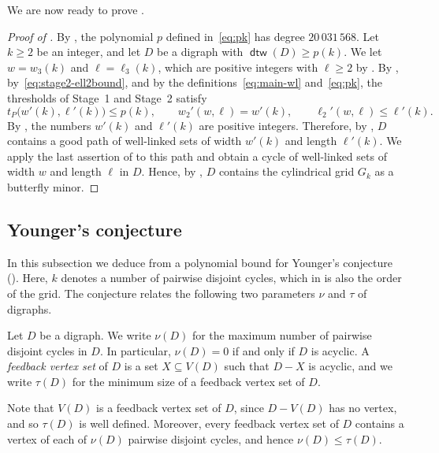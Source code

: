 \documentclass[fontsize=12pt,leading=14pt]{fullpaper}
\DeclareMathOperator{\dtw}{\mathsf{dtw}}
\begin{document}
We are now ready to prove .

\begin{proof}[Proof of ]
  By , the polynomial $p$ defined in~\eqref{eq:pk} has degree $20\,031\,568$.
  Let $k\ge2$ be an integer, and let $D$ be a digraph with $\dtw(D)\ge p(k)$.
  We let $w=w_3(k)$ and $\ell=\ell_3(k)$, which are positive integers with $\ell\ge2$ by .
  By , by~\eqref{eq:stage2-ell2bound}, and by the definitions~\eqref{eq:main-wl} and~\eqref{eq:pk}, the thresholds of Stage~1 and Stage~2 satisfy
  \[
    t_P\bigl(w'(k),\ell'(k)\bigr)\le p(k),\qquad
    w_2'(w,\ell)=w'(k),\qquad\ell_2'(w,\ell)\le\ell'(k).
  \]
  By , the numbers $w'(k)$ and $\ell'(k)$ are positive integers.
  Therefore, by , $D$ contains a good path of well-linked sets of width $w'(k)$ and length $\ell'(k)$.
  We apply the last assertion of  to this path and obtain a cycle of well-linked sets of width $w$ and length $\ell$ in $D$.
  Hence, by , $D$ contains the cylindrical grid $G_k$ as a butterfly minor.
\end{proof}

\subsection{Younger's conjecture}\label{sec:main-younger}

In this subsection we deduce from  a polynomial bound for Younger's conjecture ().
Here, $k$ denotes a number of pairwise disjoint cycles, which in  is also the order of the grid.
The conjecture relates the following two parameters $\nu$ and $\tau$ of digraphs.

\begin{definition}\label{def:nu-tau}
  Let $D$ be a digraph.
  We write $\nu(D)$ for the maximum number of pairwise disjoint cycles in $D$.
  In particular, $\nu(D)=0$ if and only if $D$ is acyclic.
  A \emph{feedback vertex set} of $D$ is a set $X\subseteq V(D)$ such that $D-X$ is acyclic, and we write $\tau(D)$ for the minimum size of a feedback vertex set of $D$.
\end{definition}

Note that $V(D)$ is a feedback vertex set of $D$, since $D-V(D)$ has no vertex, and so $\tau(D)$ is well defined.
Moreover, every feedback vertex set of $D$ contains a vertex of each of $\nu(D)$ pairwise disjoint cycles, and hence $\nu(D)\le\tau(D)$.
\end{document}
